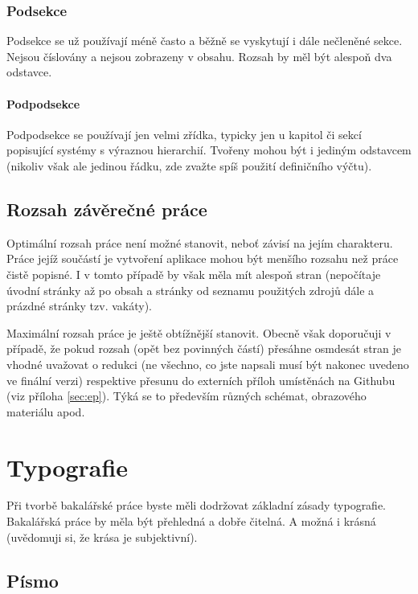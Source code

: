 \documentclass[male,czech,api_bc]{kitheses}
\begin{document}
\subsection{Podsekce}

Podsekce se už používají méně často a běžně se vyskytují i dále nečleněné sekce. Nejsou číslovány a nejsou zobrazeny v obsahu. Rozsah by měl být alespoň dva odstavce.

\subsubsection{Podpodsekce}

Podpodsekce se používají jen velmi zřídka, typicky jen u kapitol či sekcí popisující systémy s výraznou hierarchií. Tvořeny mohou být i jediným odstavcem (nikoliv však ale jedinou řádku, zde zvažte spíš použití definičního výčtu).

\section{Rozsah závěrečné práce}

Optimální rozsah  práce není možné stanovit, neboť závisí na jejím charakteru. Práce jejíž součástí je vytvoření aplikace mohou být menšího rozsahu než práce čistě popisné. I v tomto případě by však měla mít alespoň  stran (nepočítaje úvodní stránky až po obsah a stránky od seznamu použitých zdrojů dále a prázdné stránky tzv. vakáty).

Maximální rozsah práce je ještě obtížnější stanovit. Obecně však doporučuji v případě, že pokud rozsah (opět bez povinných částí) přesáhne osmdesát stran je vhodné uvažovat o redukci (ne všechno, co jste napsali musí být nakonec uvedeno ve finální verzi) respektive přesunu do externích příloh umístěnách na Githubu (viz příloha \vref{sec:ep}). Týká se to především různých schémat, obrazového materiálu apod.

\chapter{Typografie}

Při tvorbě bakalářské práce byste měli dodržovat základní zásady typografie. Bakalářská práce by měla být přehledná a dobře čitelná. A možná i krásná (uvědomuji si, že krása je subjektivní).

\section{Písmo}
\end{document}
